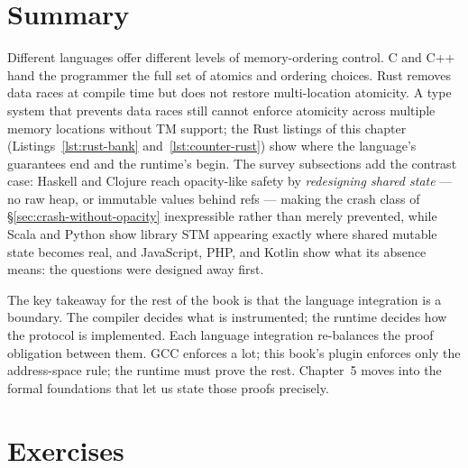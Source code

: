 \section{Summary}

Different languages offer different levels of memory-ordering control. C and
C++ hand the programmer the full set of atomics and ordering choices. Rust
removes data races at compile time but does not restore multi-location
atomicity. A type system that prevents data races still cannot enforce
atomicity across multiple memory locations without TM support; the Rust
listings of this chapter (Listings~\ref{lst:rust-bank}
and~\ref{lst:counter-rust}) show where the language's guarantees end and
the runtime's begin. The survey subsections add the contrast case: Haskell
and Clojure reach opacity-like safety by \emph{redesigning shared state} ---
no raw heap, or immutable values behind refs --- making the crash class of
\S\ref{sec:crash-without-opacity} inexpressible rather than merely prevented,
while Scala and Python show library STM appearing exactly where shared mutable
state becomes real, and JavaScript, PHP, and Kotlin show what its absence
means: the questions were designed away first.

The key takeaway for the rest of the book is that the language integration is
a boundary. The compiler decides what is instrumented; the runtime decides how
the protocol is implemented. Each language integration re-balances the proof
obligation between them. GCC enforces a lot; this book's plugin enforces only
the address-space rule; the runtime must prove the rest. Chapter~5 moves into
the formal foundations that let us state those proofs precisely.

\section{Exercises}

